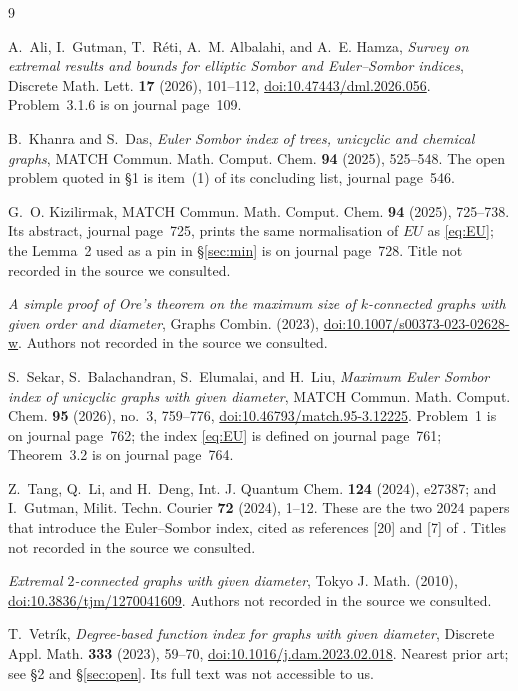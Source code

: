\documentclass[11pt]{amsart}
\theoremstyle{remark}
\newcommand{\EU}{\mathit{EU}}
\begin{document}
\begin{thebibliography}{9}

A.~Ali, I.~Gutman, T.~R\'eti, A.~M. Albalahi, and A.~E. Hamza,
\emph{Survey on extremal results and bounds for elliptic Sombor and
Euler--Sombor indices},
Discrete Math. Lett. \textbf{17} (2026), 101--112,
\href{https://doi.org/10.47443/dml.2026.056}{doi:10.47443/dml.2026.056}.
Problem~3.1.6 is on journal page~109.

B.~Khanra and S.~Das,
\emph{Euler Sombor index of trees, unicyclic and chemical graphs},
MATCH Commun. Math. Comput. Chem. \textbf{94} (2025), 525--548.
The open problem quoted in \S1 is item~(1) of its concluding list, journal
page~546.

G.~O. Kizilirmak,
MATCH Commun. Math. Comput. Chem. \textbf{94} (2025), 725--738.
Its abstract, journal page~725, prints the same normalisation of $\EU$ as
\eqref{eq:EU}; the Lemma~2 used as a pin in \S\ref{sec:min} is on journal
page~728. Title not recorded in the source we consulted.

\emph{A simple proof of Ore's theorem on the maximum size of $k$-connected
graphs with given order and diameter},
Graphs Combin. (2023),
\href{https://doi.org/10.1007/s00373-023-02628-w}{doi:10.1007/s00373-023-02628-w}.
Authors not recorded in the source we consulted.

S.~Sekar, S.~Balachandran, S.~Elumalai, and H.~Liu,
\emph{Maximum Euler Sombor index of unicyclic graphs with given diameter},
MATCH Commun. Math. Comput. Chem. \textbf{95} (2026), no.~3, 759--776,
\href{https://doi.org/10.46793/match.95-3.12225}{doi:10.46793/match.95-3.12225}.
Problem~1 is on journal page~762; the index \eqref{eq:EU} is defined on
journal page~761; Theorem~3.2 is on journal page~764.

Z.~Tang, Q.~Li, and H.~Deng,
Int. J. Quantum Chem. \textbf{124} (2024), e27387; and I.~Gutman,
Milit. Techn. Courier \textbf{72} (2024), 1--12.
These are the two 2024 papers that introduce the Euler--Sombor index, cited as
references [20] and [7] of \cite{Sekar}. Titles not recorded in the source we
consulted.

\emph{Extremal $2$-connected graphs with given diameter},
Tokyo J. Math. (2010),
\href{https://doi.org/10.3836/tjm/1270041609}{doi:10.3836/tjm/1270041609}.
Authors not recorded in the source we consulted.

T.~Vetr\'ik,
\emph{Degree-based function index for graphs with given diameter},
Discrete Appl. Math. \textbf{333} (2023), 59--70,
\href{https://doi.org/10.1016/j.dam.2023.02.018}{doi:10.1016/j.dam.2023.02.018}.
Nearest prior art; see \S2 and \S\ref{sec:open}. Its full text was not
accessible to us.


\end{thebibliography}
\end{document}
